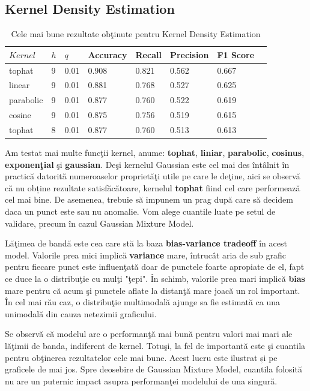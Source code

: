 \subsection{Kernel Density Estimation}

\begin{table}[H]
  \centering
  \begin{tabularx}{\textwidth}{
      |X
      |X
      |X
      |X
      |X
      |X
      |X
      |X|
  }
  \hline
  $Kernel$ & $h$ & $q$ & {Accuracy} & {Recall} & {Precision} & {F1 Score} \\
  \hline
  \rowcolor{gray!20} tophat	& 9	& 0.01 & 0.908 & 0.821 & 0.562 & 0.667  \\
  linear & 9 & 0.01	& 0.881 & 0.768	& 0.527 & 0.625 \\
  \rowcolor{gray!20} parabolic & 9 & 0.01 & 0.877 & 0.760 & 0.522 & 0.619  \\
  cosine & 9 & 0.01	& 0.875 & 0.756	& 0.519 & 0.615 \\
  \rowcolor{gray!20} tophat	& 8	& 0.01 & 0.877 & 0.760 & 0.513 & 0.613 \\
  \hline
  \end{tabularx}
  \caption{Cele mai bune rezultate obţinute pentru Kernel Density Estimation}
\end{table}

Am testat mai multe funcţii kernel, anume: \textbf{tophat}, 
\textbf{liniar}, \textbf{parabolic}, \textbf{cosinus},
\textbf{exponenţial} şi \textbf{gaussian}. 
Deşi kernelul Gaussian este cel mai des întâlnit în practică
datorită numeroaselor proprietăţi utile pe care le deţine, aici se observă
că nu obține rezultate satisfăcătoare, kernelul \textbf{tophat}
fiind cel care performează
cel mai bine. De asemenea, trebuie 
să impunem un prag după care să decidem daca un punct este sau nu anomalie. 
Vom alege cuantile luate pe setul de validare, precum în cazul 
Gaussian Mixture Model.

Lăţimea de bandă este cea care stă la baza \textbf{bias-variance tradeoff} 
în acest model.
Valorile prea mici implică \textbf{variance} mare, întrucât aria de sub grafic 
pentru fiecare punct este influenţată doar de punctele foarte apropiate de el, 
fapt ce duce la o distribuţie cu mulţi "ţepi". 
În schimb, valorile prea mari implică \textbf{bias} mare pentru că acum şi punctele 
aflate la distanţă mare joacă un rol important. În cel mai rău caz, o distribuţie 
multimodală ajunge sa fie estimată ca una unimodală din cauza netezimii graficului.

Se observă că modelul are o performanţă mai bună pentru valori 
mai mari ale lăţimii de banda, indiferent de kernel. Totuşi, 
la fel de importantă este şi cuantila pentru obţinerea rezultatelor 
cele mai bune. Acest lucru este ilustrat și pe graficele de mai jos. 
Spre deosebire de Gaussian Mixture Model, cuantila 
folosită nu are un puternic impact asupra performanţei modelului de una singură.


